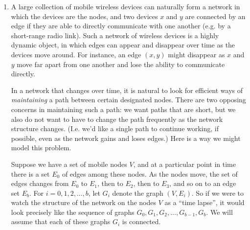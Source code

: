 \documentclass[12pt]{article}
\begin{document}
\begin{enumerate}



\item

A large collection of mobile wireless devices 
can naturally form a network 
in which the devices are the nodes, and two  
devices $x$ and $y$ are connected by an edge 
if they are able to directly communicate with 
one another (e.g. by a short-range radio link). 
Such a network of wireless devices 
is a highly dynamic object, in which edges 
can appear and disappear over time as the devices move around.   
For instance, an edge $(x,y)$ might disappear as $x$ and $y$ 
move far apart from one another and lose  
the ability to communicate directly. 
 
In a network that changes over time, it is natural 
to look for efficient ways of {\em maintaining} 
a path between certain designated nodes. 
There are two opposing concerns in maintaining such a path: 
we want paths that are short, but we also do not 
want to have to change the path frequently  
as the network structure changes. 
(I.e. we'd like a single path to continue working, if possible, 
even as the network gains and loses edges.) 
Here is a way we might model this problem. 
 
Suppose we have a set of mobile nodes $V$, 
and at a particular point in time there is a set 
$E_0$ of edges among these nodes. 
As the nodes move, the set of edges changes 
from $E_0$ to $E_1$, then to $E_2$, then to $E_3$, 
and so on to an edge set $E_b$. 
For $i = 0, 1, 2, \ldots, b$,  
let $G_i$ denote the graph $(V,E_i)$. 
So if we were to watch the structure of the network 
on the nodes $V$ as a ``time lapse'', it would look precisely 
like the sequence of graphs $G_0, G_1, G_2, \ldots, G_{b-1}, G_b$. 
We will assume that each of these graphs $G_i$ is connected. 
 

\end{enumerate}
\end{document}
